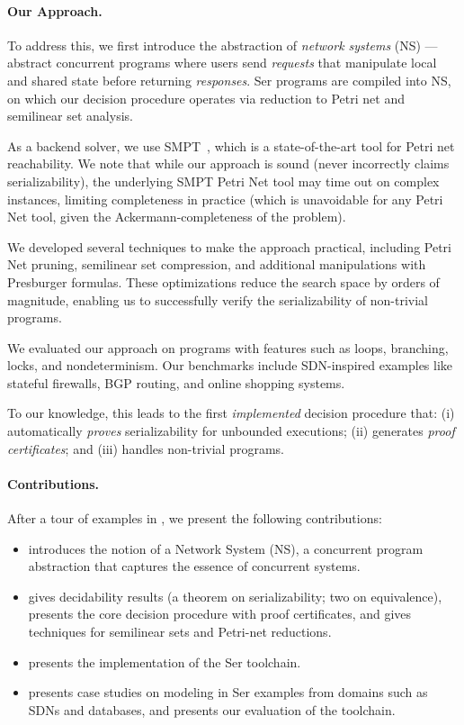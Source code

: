 \paragraph{Our Approach.}
To address this, we first introduce the abstraction of \textit{network systems} (NS) --- abstract concurrent programs where users send \textit{requests} that manipulate local and shared state before returning \textit{responses}. Ser programs are compiled into NS, on which our decision procedure operates via reduction to Petri net and semilinear set analysis.

As a backend solver, we use SMPT~\cite{AmDa23}, which is a state-of-the-art tool for Petri net reachability.
We note that while our approach is sound (never incorrectly claims serializability), the underlying SMPT Petri Net tool may time out on complex instances, limiting completeness in practice (which is unavoidable for any Petri Net tool, given the Ackermann-completeness of the problem).

We developed several techniques to make the approach practical, including Petri Net pruning, semilinear set compression, and additional manipulations with Presburger formulas.
These optimizations reduce the search space by orders of magnitude, enabling us to successfully verify the serializability of non-trivial programs.

We evaluated our approach on programs with features such as loops, branching, locks, and nondeterminism. Our benchmarks include SDN-inspired examples like stateful firewalls, BGP routing, and online shopping systems.

To our knowledge, this leads to the first \emph{implemented} decision procedure that: (i) automatically \textit{proves} serializability for unbounded executions; (ii) generates \textit{proof certificates}; and (iii) handles non-trivial programs.


\paragraph{Contributions.}
After a tour of examples in , we present the following contributions:
\begin{itemize}
    \item {} introduces the notion of a Network System (NS), a concurrent program abstraction that captures the essence of concurrent systems.
    \item {} gives decidability results (a theorem on serializability; two on equivalence), presents the core decision procedure with proof certificates, and gives techniques for semilinear sets and Petri-net reductions.
    \item {} presents the implementation of the Ser toolchain.
    \item {} presents case studies on modeling in Ser examples from domains such as SDNs and databases, and presents our evaluation of the toolchain.
\end{itemize}



